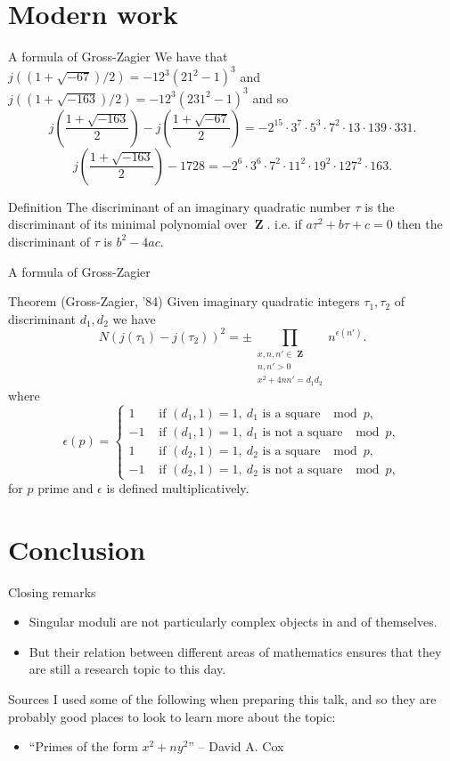 \documentclass{beamer}
\DeclareMathOperator{\ZZ}{\mathbf{Z}}
\begin{document}
\section{Modern work}
\begin{frame}{A formula of Gross-Zagier}
We have that $j((1+\sqrt{-67})/2) = -12^3(21^2 - 1)^3$ and $j((1+\sqrt{-163})/2) = -12^3(231^2 - 1)^3$ and so
\[
j\left(\frac{1+\sqrt{-163}}{2}\right) - j\left(\frac{1+\sqrt{-67}}{2}\right) = -2^{15}\cdot 3^7\cdot 5^3 \cdot 7^2\cdot 13\cdot 139\cdot 331.
\]
\pause
\[
j\left(\frac{1+\sqrt{-163}}{2}\right) - 1728 = -2^6\cdot3^6\cdot7^2\cdot11^2\cdot19^2\cdot127^2\cdot163.
\]
\pause
\begin{block}{Definition}
The discriminant of an imaginary quadratic number $\tau$ is the discriminant of its minimal polynomial over $\ZZ$.
i.e. if $a\tau^2 + b\tau + c = 0$ then the discriminant of $\tau$ is $b^2 - 4ac$.
\end{block}
\end{frame}

\begin{frame}{A formula of Gross-Zagier}
\begin{block}{Theorem (Gross-Zagier, '84)}
Given imaginary quadratic integers $\tau_1,\tau_2$ of discriminant $d_1,d_2$ we have
\[
N(j(\tau_1) - j(\tau_2))^2 = \pm\prod_{ \substack{x,n,n'\in\ZZ \\ n,n'> 0 \\ x^2 +4nn' = d_1d_2}} n^{\epsilon(n')}.
\]
where
\[
\epsilon(p) = \begin{cases}
1 &\text{ if } (d_1,1) = 1,\ d_1\text{ is a square }\mod{p},\\
-1 &\text{ if } (d_1,1) = 1,\ d_1\text{ is not a square }\mod{p},\\
1 &\text{ if } (d_2,1) = 1,\ d_2\text{ is a square }\mod{p},\\
-1 &\text{ if } (d_2,1) = 1,\ d_2\text{ is not a square }\mod{p},
\end{cases}
\]
for $p$ prime and $\epsilon$ is defined multiplicatively.
\end{block}
\end{frame}

\section{Conclusion}
\begin{frame}{Closing remarks}
\begin{itemize}
\item Singular moduli are not particularly complex objects in and of themselves.
\pause \item But their relation between different areas of mathematics ensures that they are still a research topic to this day.
\end{itemize}
\end{frame}

\begin{frame}{Sources}
I used some of the following when preparing this talk, and so they are probably good places to look to learn more about the topic:
\begin{itemize}
\item ``Primes of the form $x^2 + ny^2$'' -- David A. Cox
\end{itemize}
\end{frame}
\end{document}
